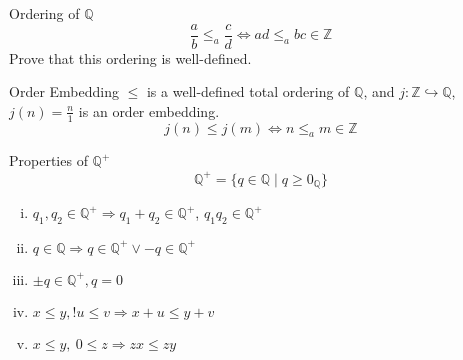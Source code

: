 \documentclass[8pt]{extarticle}
\newcommand{\Q}{\mathbb{Q}}
\newcommand{\Z}{\mathbb{Z}}
\begin{document}
  \begin{problem}{Ordering of $\Q$}
    \[
      \frac{a}{b} \leq_a \frac{c}{d} \Leftrightarrow ad\leq_{a} bc \in \Z
    \] 
    Prove that this ordering is well-defined.

    \begin{problem}{Order Embedding}
      $\leq$ is a well-defined total ordering of $\Q$, and $j: \Z\hookrightarrow \Q$, $j(n) = \frac{n}{1}$ is an order embedding.
      \[
        j(n) \leq j(m) \Leftrightarrow n\leq_a m\in \Z
      \] 
    \end{problem}
    \begin{problem}{Properties of $\Q^+$}
      \[
        \Q^+ = \{q \in \Q \mid q \geq 0_{\Q}\}
      \] 
      \begin{enumerate}[(i)]
        \item $q_1,q_2\in \Q^+ \Rightarrow q_1 + q_2 \in \Q^+$, $q_1q_2 \in \Q^+$
        \item $q\in \Q \Rightarrow q\in \Q^+ \vee -q\in \Q^+$
        \item $\pm q\in \Q^+,q = 0$
        \item $x\leq y,!u\leq v \Rightarrow x+u \leq y+v$
        \item $x\leq y,~0\leq z \Rightarrow zx \leq zy$
      \end{enumerate}
    \end{problem}
  \end{problem}
\end{document}
